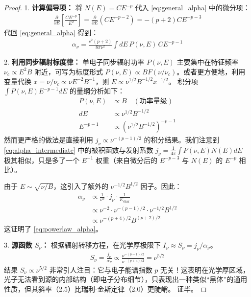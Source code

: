 \begin{proof}
    1. \textbf{计算偏导项：}
    将 $N(E) = C E^{-p}$ 代入 \eqref{eq:general_alpha} 中的微分项：
    \begin{align}
        \frac{\partial}{\partial E} \left[ \frac{C E^{-p}}{E^2} \right] = \frac{\partial}{\partial E} (C E^{-p-2}) = -(p+2) C E^{-p-3}
    \end{align}
    代回 \eqref{eq:general_alpha} 得到：
    \begin{align}
        \alpha_{\nu} = \frac{c^2 (p+2)}{8\pi \nu^2} \int dE \, P(\nu, E) \, C E^{-p-1} \label{eq:alpha_intermediate}
    \end{align}
    
    2. \textbf{利用同步辐射标度律：}
    单电子同步辐射功率 $P(\nu, E)$ 主要集中在特征频率 $\nu_c \propto E^2 B$ 附近，可写为标度形式 $P(\nu, E) \propto B F(\nu/\nu_c)$。或者更方便地，利用变量代换 $x = \nu / \nu_c \propto \nu E^{-2} B^{-1}$，则 $E \propto \nu^{1/2} B^{-1/2} x^{-1/2}$。
    积分项 $\int P(\nu, E) E^{-p-1} dE$ 的量纲分析如下：
    \begin{align}
        P(\nu, E) &\propto B \quad (\text{功率量级}) \\
        dE &\propto \nu^{1/2} B^{-1/2} \\
        E^{-p-1} &\propto (\nu^{1/2} B^{-1/2})^{-p-1}
    \end{align}
    然而更严格的做法是直接利用 $j_{\nu} \propto \nu^{-(p-1)/2}$ 的积分结果。我们注意到 \eqref{eq:alpha_intermediate} 中的被积函数与发射系数 $j_{\nu} = \frac{1}{4\pi} \int P(\nu, E) N(E) dE$ 极其相似，只是多了一个 $E^{-1}$ 权重（来自微分后的 $E^{-p-3}$ 与 $N(E)$ 的 $E^{-p}$ 相比）。
    
    由于 $E \sim \sqrt{\nu/B}$，这引入了额外的 $\nu^{-1/2} B^{1/2}$ 因子。因此：
    \begin{align}
        \alpha_{\nu} &\propto \frac{1}{\nu^2} \cdot j_{\nu} \cdot \frac{1}{E_{\text{char}}} \\
        &\propto \nu^{-2} \cdot \nu^{-(p-1)/2} \cdot \nu^{-1/2} B^{1/2} \\
        &\propto \nu^{-(p+4)/2} B^{(p+2)/2}
    \end{align}
    这证明了 \eqref{eq:powerlaw_alpha}。
    
    3. \textbf{源函数 $S_{\nu}$：}
    根据辐射转移方程，在光学厚极限下 $I_{\nu} \approx S_{\nu} = j_{\nu} / \alpha_{\nu}$。
    \begin{align}
        S_{\nu} = \frac{j_{\nu}}{\alpha_{\nu}} \propto \frac{\nu^{-(p-1)/2}}{\nu^{-(p+4)/2}} = \nu^{5/2}
    \end{align}
    结果 $S_{\nu} \propto \nu^{5/2}$ 非常引人注目：它与电子能谱指数 $p$ 无关！这表明在光学厚区域，光子无法看到源的内部结构（即电子分布细节），只表现出一种类似“黑体”的通用性质，但其斜率（2.5）比瑞利-金斯定律（2.0）更陡峭。
    证毕。
\end{proof}

